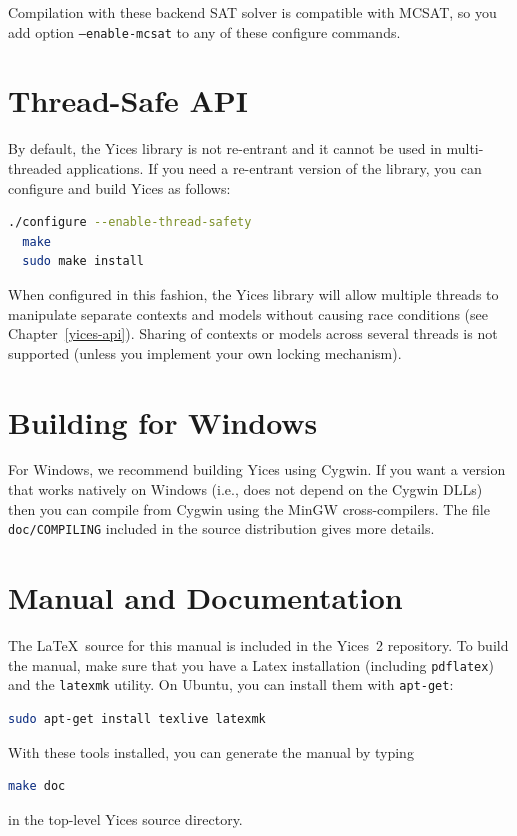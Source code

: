 \documentclass[11pt,twoside,fleqn,openright,titlepage]{cslreport}
\begin{document}
Compilation with these backend SAT solver is compatible with MCSAT, so
you add option \texttt{--enable-mcsat} to any of these configure commands.

\section{Thread-Safe API}

By default, the Yices library is not re-entrant and it cannot be used
in multi-threaded applications. If you need a re-entrant version of
the library, you can configure and build Yices as follows:
\begin{small}
\begin{lstlisting}[language=sh]
  ./configure --enable-thread-safety
  make
  sudo make install
\end{lstlisting}
\end{small}
When configured in this fashion, the Yices library will allow multiple
threads to manipulate separate contexts and models without causing race
conditions (see Chapter~\ref{yices-api}). Sharing of contexts or
models across several threads is not supported (unless you implement
your own locking mechanism).


\section{Building for Windows}

For Windows, we recommend building Yices using Cygwin. If you want a
version that works natively on Windows (i.e., does not depend on the
Cygwin DLLs) then you can compile from Cygwin using the MinGW
cross-compilers.  The file \texttt{doc/COMPILING} included in the
source distribution gives more details.

\section{Manual and Documentation}

The \LaTeX\ source for this manual is included in the Yices~2
repository.  To build the manual, make sure that you have a Latex
installation (including \texttt{pdflatex}) and the \texttt{latexmk} utility.
On Ubuntu, you can install them with \texttt{apt-get}:
\begin{small}
\begin{lstlisting}[language=sh]
  sudo apt-get install texlive latexmk
\end{lstlisting}
\end{small}
With these tools installed, you can generate the manual by typing
\begin{small}
\begin{lstlisting}[language=sh]
  make doc
\end{lstlisting}
\end{small}
in the top-level Yices source directory.
\end{document}
